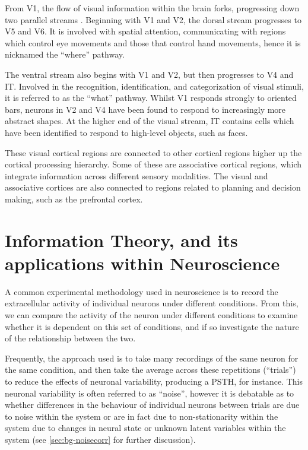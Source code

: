 From \ac{V1}, the flow of visual information within the brain forks, progressing down two parallel streams \citep{Goodale199220,Mishkin198257}.
Beginning with \ac{V1} and \ac{V2}, the dorsal stream progresses to \ac{V5} and \ac{V6}.
It is involved with spatial attention, communicating with regions which control eye movements and those that control hand movements, hence it is nicknamed the ``where'' pathway.

The ventral stream also begins with \ac{V1} and \ac{V2}, but then progresses to \ac{V4} and \ac{IT}.
Involved in the recognition, identification, and categorization of visual stimuli, it is referred to as the ``what'' pathway.
Whilst \ac{V1} responds strongly to oriented bars, neurons in \ac{V2} and \ac{V4} have been found to respond to increasingly more abstract shapes.
At the higher end of the visual stream, \ac{IT} contains cells which have been identified to respond to high-level objects, such as faces.%

These visual cortical regions are connected to other cortical regions higher up the cortical processing hierarchy.
Some of these are associative cortical regions, which integrate information across different sensory modalities.
The visual and associative cortices are also connected to regions related to planning and decision making, such as the prefrontal cortex.


\section{Information Theory, and its applications within Neuroscience}
\label{sec:bgit}

A common experimental methodology used in neuroscience is to record the extracellular activity of individual neurons under different conditions.
From this, we can compare the activity of the neuron under different conditions to examine whether it is dependent on this set of conditions, and if so investigate the nature of the relationship between the two.

Frequently, the approach used is to take many recordings of the same neuron for the same condition, and then take the average across these repetitions (``trials'') to reduce the effects of neuronal variability, producing a \ac{PSTH}, for instance.
This neuronal variability is often referred to as ``noise'', however it is debatable as to whether differences in the behaviour of individual neurons between trials are due to noise within the system or are in fact due to non-stationarity within the system due to changes in neural state or unknown latent variables within the system (see \autoref{sec:bg-noisecorr} for further discussion).

